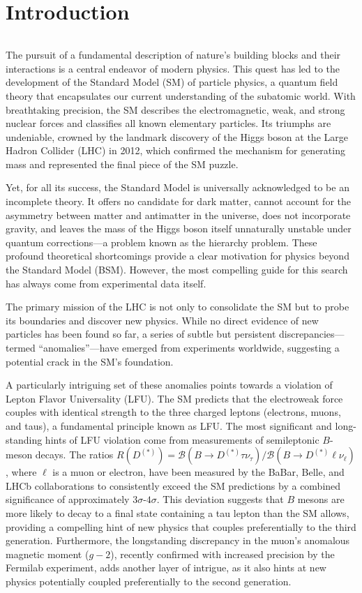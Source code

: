 \chapter*{Introduction}
$ $ 

The pursuit of a fundamental description of nature's building blocks and their interactions is a central endeavor of modern physics. This quest has led to the development of the Standard Model (SM) of particle physics, a quantum field theory that encapsulates our current understanding of the subatomic world. With breathtaking precision, the SM describes the electromagnetic, weak, and strong nuclear forces and classifies all known elementary particles. Its triumphs are undeniable, crowned by the landmark discovery of the Higgs boson at the Large Hadron Collider (LHC) in 2012, which confirmed the mechanism for generating mass and represented the final piece of the SM puzzle.

Yet, for all its success, the Standard Model is universally acknowledged to be an incomplete theory. It offers no candidate for dark matter, cannot account for the asymmetry between matter and antimatter in the universe, does not incorporate gravity, and leaves the mass of the Higgs boson itself unnaturally unstable under quantum corrections—a problem known as the hierarchy problem. These profound theoretical shortcomings provide a clear motivation for physics beyond the Standard Model (BSM). However, the most compelling guide for this search has always come from experimental data itself.

The primary mission of the LHC is not only to consolidate the SM but to probe its boundaries and discover new physics. While no direct evidence of new particles has been found so far, a series of subtle but persistent discrepancies—termed ``anomalies''—have emerged from experiments worldwide, suggesting a potential crack in the SM's foundation.

A particularly intriguing set of these anomalies points towards a violation of Lepton Flavor Universality (LFU). The SM predicts that the electroweak force couples with identical strength to the three charged leptons (electrons, muons, and taus), a fundamental principle known as LFU. The most significant and long-standing hints of LFU violation come from measurements of semileptonic $B$-meson decays. The ratios $R(D^{(*)}) = \mathcal{B}(B \to D^{(*)} \tau \nu_\tau) / \mathcal{B}(B \to D^{(*)} \ell \nu_\ell)$, where $\ell$ is a muon or electron, have been measured by the BaBar, Belle, and LHCb collaborations to consistently exceed the SM predictions by a combined significance of approximately $3\sigma$-$4\sigma$. This deviation suggests that $B$ mesons are more likely to decay to a final state containing a tau lepton than the SM allows, providing a compelling hint of new physics that couples preferentially to the third generation. Furthermore, the longstanding discrepancy in the muon's anomalous magnetic moment ($g-2$), recently confirmed with increased precision by the Fermilab experiment, adds another layer of intrigue, as it also hints at new physics potentially coupled preferentially to the second generation.

